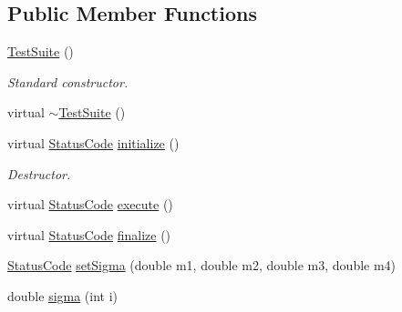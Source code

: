 \subsection*{Public Member Functions}
\begin{DoxyCompactItemize}
\item 
\hyperlink{classTestSuite_af7291e6d8b53443604ee0c1fcf1fadfc}{Test\+Suite} ()
\begin{DoxyCompactList}\small\item\em Standard constructor. \end{DoxyCompactList}\item 
virtual \hyperlink{classTestSuite_af55b4cff7d5856cd9399980e168ebc3e}{$\sim$\+Test\+Suite} ()
\item 
virtual \hyperlink{classStatusCode}{Status\+Code} \hyperlink{classTestSuite_a78793d8c648ce1c47671c263014ab394}{initialize} ()
\begin{DoxyCompactList}\small\item\em Destructor. \end{DoxyCompactList}\item 
virtual \hyperlink{classStatusCode}{Status\+Code} \hyperlink{classTestSuite_a531665e9bba1edb96a3ffdd421f642e2}{execute} ()
\item 
virtual \hyperlink{classStatusCode}{Status\+Code} \hyperlink{classTestSuite_a3a1658a78902d96e00c888c17862abdb}{finalize} ()
\item 
\hyperlink{classStatusCode}{Status\+Code} \hyperlink{classTestSuite_aea5b144ea26479d5255efffab4c125f4}{set\+Sigma} (double m1, double m2, double m3, double m4)
\item 
double \hyperlink{classTestSuite_a9c74de1a21bc0998253da5e9befe6a42}{sigma} (int i)
\end{DoxyCompactItemize}
